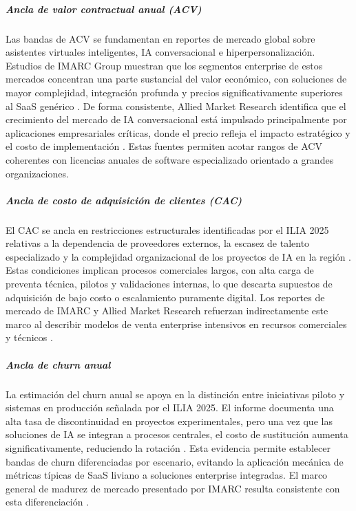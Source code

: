 
\subparagraph{Ancla de valor contractual anual (ACV)}
Las bandas de ACV se fundamentan en reportes de mercado global sobre asistentes virtuales inteligentes, IA conversacional e hiperpersonalización. Estudios de IMARC Group muestran que los segmentos enterprise de estos mercados concentran una parte sustancial del valor económico, con soluciones de mayor complejidad, integración profunda y precios significativamente superiores al SaaS genérico \cite{IMARCIVA2024}. De forma consistente, Allied Market Research identifica que el crecimiento del mercado de IA conversacional está impulsado principalmente por aplicaciones empresariales críticas, donde el precio refleja el impacto estratégico y el costo de implementación \cite{AlliedMarketResearchIVA2024}. Estas fuentes permiten acotar rangos de ACV coherentes con licencias anuales de software especializado orientado a grandes organizaciones.

\subparagraph{Ancla de costo de adquisición de clientes (CAC)}
El CAC se ancla en restricciones estructurales identificadas por el ILIA 2025 relativas a la dependencia de proveedores externos, la escasez de talento especializado y la complejidad organizacional de los proyectos de IA en la región \cite{ILIA2025}. Estas condiciones implican procesos comerciales largos, con alta carga de preventa técnica, pilotos y validaciones internas, lo que descarta supuestos de adquisición de bajo costo o escalamiento puramente digital. Los reportes de mercado de IMARC y Allied Market Research refuerzan indirectamente este marco al describir modelos de venta enterprise intensivos en recursos comerciales y técnicos \cite{IMARCIVA2024,AlliedMarketResearchIVA2024}.

\subparagraph{Ancla de \textit{churn} anual}
La estimación del churn anual se apoya en la distinción entre iniciativas piloto y sistemas en producción señalada por el ILIA 2025. El informe documenta una alta tasa de discontinuidad en proyectos experimentales, pero una vez que las soluciones de IA se integran a procesos centrales, el costo de sustitución aumenta significativamente, reduciendo la rotación \cite{ILIA2025}. Esta evidencia permite establecer bandas de churn diferenciadas por escenario, evitando la aplicación mecánica de métricas típicas de SaaS liviano a soluciones enterprise integradas. El marco general de madurez de mercado presentado por IMARC resulta consistente con esta diferenciación \cite{IMARCIVA2024}.

